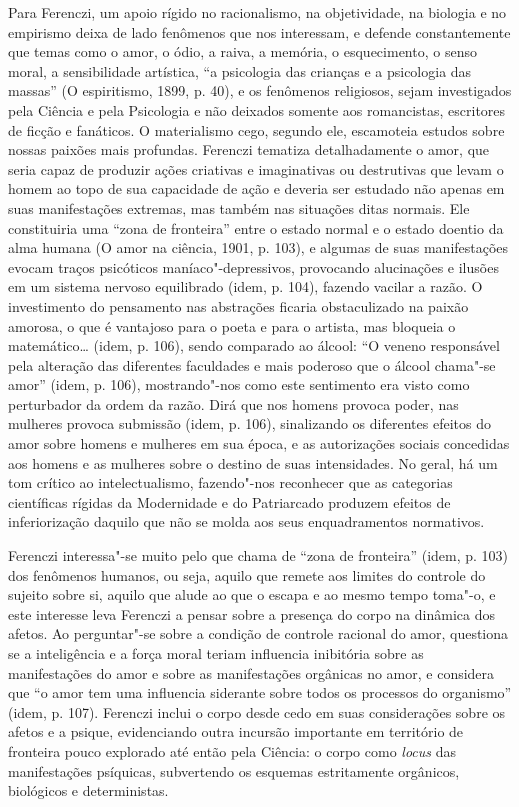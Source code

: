 Para Ferenczi, um apoio rígido no racionalismo, na objetividade, na
biologia e no empirismo deixa de lado fenômenos que nos interessam, e
defende constantemente que temas como o amor, o ódio, a raiva, a
memória, o esquecimento, o senso moral, a sensibilidade artística, ``a
psicologia das crianças e a psicologia das massas'' (O espiritismo,
1899, p. 40), e os fenômenos religiosos, sejam investigados pela Ciência
e pela Psicologia e não deixados somente aos romancistas, escritores de
ficção e fanáticos. O materialismo cego, segundo ele, escamoteia estudos
sobre nossas paixões mais profundas. Ferenczi tematiza detalhadamente o
amor, que seria capaz de produzir ações criativas e imaginativas ou
destrutivas que levam o homem ao topo de sua capacidade de ação e
deveria ser estudado não apenas em suas manifestações extremas, mas
também nas situações ditas normais. Ele constituiria uma ``zona de
fronteira'' entre o estado normal e o estado doentio da alma humana (O
amor na ciência, 1901, p. 103), e algumas de suas manifestações evocam
traços psicóticos maníaco"-depressivos, provocando alucinações e ilusões
em um sistema nervoso equilibrado (idem, p. 104), fazendo vacilar a
razão. O investimento do pensamento nas abstrações ficaria obstaculizado
na paixão amorosa, o que é vantajoso para o poeta e para o artista, mas
bloqueia o matemático\ldots{} (idem, p. 106), sendo comparado ao álcool: ``O
veneno responsável pela alteração das diferentes faculdades e mais
poderoso que o álcool chama"-se amor'' (idem, p. 106), mostrando"-nos como
este sentimento era visto como perturbador da ordem da razão. Dirá que
nos homens provoca poder, nas mulheres provoca submissão (idem, p. 106),
sinalizando os diferentes efeitos do amor sobre homens e mulheres em sua
época, e as autorizações sociais concedidas aos homens e as mulheres
sobre o destino de suas intensidades. No geral, há um tom crítico ao
intelectualismo, fazendo"-nos reconhecer que as categorias científicas
rígidas da Modernidade e do Patriarcado produzem efeitos de
inferiorização daquilo que não se molda aos seus enquadramentos
normativos.

Ferenczi interessa"-se muito pelo que chama de ``zona de fronteira''
(idem, p. 103) dos fenômenos humanos, ou seja, aquilo que remete aos
limites do controle do sujeito sobre si, aquilo que alude ao que o
escapa e ao mesmo tempo toma"-o, e este interesse leva Ferenczi a pensar
sobre a presença do corpo na dinâmica dos afetos. Ao perguntar"-se sobre
a condição de controle racional do amor, questiona se a inteligência e a
força moral teriam influencia inibitória sobre as manifestações do amor
e sobre as manifestações orgânicas no amor, e considera que ``o amor tem
uma influencia siderante sobre todos os processos do organismo'' (idem,
p. 107). Ferenczi inclui o corpo desde cedo em suas considerações sobre
os afetos e a psique, evidenciando outra incursão importante em
território de fronteira pouco explorado até então pela Ciência: o corpo
como \emph{locus} das manifestações psíquicas, subvertendo os esquemas
estritamente orgânicos, biológicos e deterministas.

